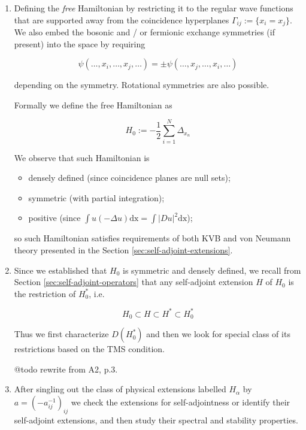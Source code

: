 \documentclass[11pt, a4paper, german]{article}
\theoremstyle{plain}
\theoremstyle{definition}
\theoremstyle{remark}
\numberwithin{equation}{section}
\numberwithin{theorem}{section}
\begin{document}
\begin{enumerate}
\item

Defining the \textit{free} Hamiltonian by restricting it to the regular wave functions that are supported away from the coincidence hyperplanes $\Gamma_{ij}:=\{x_i=x_j\}$. We also embed the bosonic and / or fermionic exchange symmetries (if present) into the space by requiring

\begin{equation}
\psi(\dots, x_i, \dots, x_j, \dots)=\pm \psi(\dots, x_j, \dots, x_i, \dots)
\end{equation}

depending on the symmetry. Rotational symmetries are also possible.

Formally we define the free Hamiltonian as

\begin{equation}
H_0 := - \frac 12 \sum _{i=1} ^N \Delta _{x_n}
\end{equation}

We observe that such Hamiltonian is
\begin{itemize}
\item densely defined (since coincidence planes are null sets);
\item symmetric (with partial integration);
\item positive (since $\int u(-\Delta u) \text{dx} = \int \vert Du \vert ^2 \text{dx} $);
\end{itemize}

so such Hamiltonian satisfies requirements of both KVB and von Neumann theory presented in the Section \ref{sec:self-adjoint-extensions}.

\item 

Since we established that $H_0$ is symmetric and densely defined, we recall from Section \ref{sec:self-adjoint-operators} that any self-adjoint extension $H$ of $H_0$ is the restriction of $H_0^*$, i.e.

\begin{equation}
H_0\subset H \subset H^* \subset H_0^*
\end{equation}

Thus we first characterize $D(H_0^*)$ and then we look for special class of its restrictions based on the TMS condition.

@todo rewrite from A2, p.3.

\item

After singling out the class of physical extensions labelled $H_\alpha$ by $a=(-a_{ij}^{-1})_{ij}$ we check the extensions for self-adjointness or identify their self-adjoint extensions, and then study their spectral and stability properties.

\end{enumerate}
\end{document}
